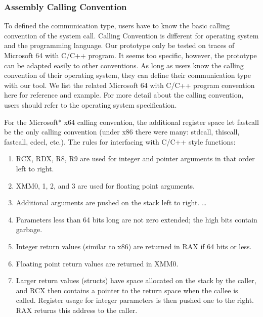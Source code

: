 \documentclass[paper=a4, fontsize=11pt]{scrartcl}
\numberwithin{equation}{section}		%
\numberwithin{figure}{section}			%
\numberwithin{table}{section}				%
\begin{document}
\subsubsection{Assembly Calling Convention}
To defined the communication type, users have to know the basic calling convention of the system call. 
Calling Convention is different for operating system and the programming language. Our prototype only be tested on traces of Microsoft 64 with C/C++ program. It seems too specific, however, the prototype can be adapted easily to other conventions. As long as users know the calling convention of their operating system, they can define their communication type with our tool. We list the related Microsoft 64 with C/C++ program convention here for reference and example. For more detail about the calling convention, users should refer to the operating system specification.\par
For the Microsoft* x64 calling convention, the additional register space let fastcall be the only calling convention (under x86 there were many: stdcall, thiscall, fastcall, cdecl, etc.). The rules for interfacing with C/C++ style functions:\par
\begin{enumerate}  
\item RCX, RDX, R8, R9 are used for integer and pointer arguments in that order left to right.
\item XMM0, 1, 2, and 3 are used for floating point arguments.
\item Additional arguments are pushed on the stack left to right. \ldots 
\item Parameters less than 64 bits long are not zero extended; the high bits contain garbage.
\item Integer return values (similar to x86) are returned in RAX if 64 bits or less.
\item Floating point return values are returned in XMM0.
\item Larger return values (structs) have space allocated on the stack by the caller, and RCX then contains a pointer to the return space when the callee is called. Register usage for integer parameters is then pushed one to the right. RAX returns this address to the caller.
\end{enumerate}
\end{document}
